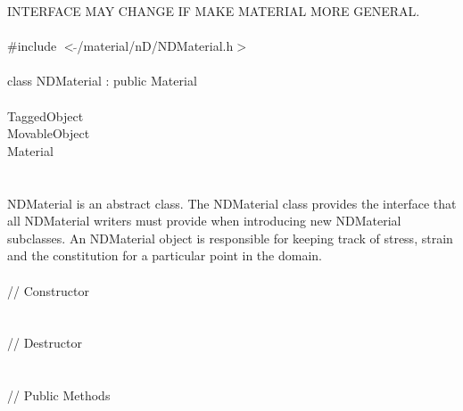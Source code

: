 
INTERFACE MAY CHANGE IF MAKE MATERIAL MORE GENERAL. \\

   \\
\indent \#include $<\tilde{ }$/material/nD/NDMaterial.h$>$  \\

  \\
\indent class NDMaterial : public Material \\

 \\
\indent TaggedObject \\
\indent MovableObject \\
\indent\indent Material \\
\indent\indent{} \\

  \\
\indent NDMaterial is an abstract class. The
NDMaterial class provides the interface that all
NDMaterial writers must provide when introducing new
NDMaterial subclasses. An NDMaterial object 
is responsible for keeping track of stress, strain and the
constitution for a particular point in the domain. \\ 

 \\
\indent // Constructor \\
  \\ \\
\indent // Destructor \\
\\ \\
\indent // Public Methods \\
 \\
 \\
 \\
 \\
 \\
 \\
 \\


